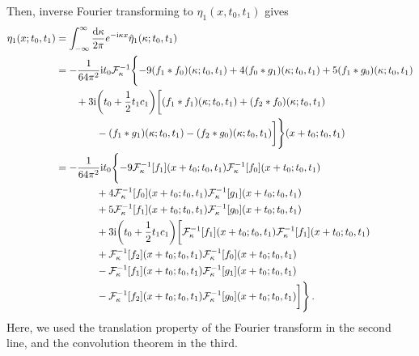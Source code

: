 \documentclass{jfm}
\newcommand{\im}{\mathrm{i}}
\begin{document}
Then, inverse Fourier transforming to $\eta_1(x,t_0,t_1)$ gives
\begin{equation}
\begin{aligned}
  \eta_1(x;t_0,t_1) &=
  \int_{-\infty}^{\infty} \frac{\dd{\kappa}}{2\pi} e^{-\im \kappa x}
  \hat{\eta}_1(\kappa;t_0,t_1) \\
  &= -\frac{1}{64 \pi^2} \im t_0 \mathcal{F}^{-1}_{\kappa}
  \Biggl\{
    -9 (f_1 * f_0)(\kappa; t_0,t_1)
    +4 (f_0 * g_1)(\kappa; t_0,t_1)
    +5 (f_1 * g_0)(\kappa; t_0,t_1) \\
    &\qquad
    + 3 \im \pqty{t_0 + \frac{1}{2} t_1 c_1} \biggl[
      (f_1 * f_1)(\kappa; t_0,t_1)
      + (f_2 * f_0)(\kappa; t_0,t_1) \\
    &\qquad\qquad
      - (f_1 * g_1)(\kappa; t_0,t_1)
      - (f_2 * g_0)(\kappa; t_0,t_1)
      \biggr] \Biggr\}
    (x + t_0;t_0,t_1) \\
  &= -\frac{1}{64 \pi^2} \im t_0
    \Biggl\{
     -9 \mathcal{F}^{-1}_{\kappa}[f_1](x + t_0;t_0,t_1)
       \mathcal{F}^{-1}_{\kappa}[f_0](x + t_0;t_0,t_1) \\
    &\qquad\qquad
    +4 \mathcal{F}^{-1}_{\kappa}[f_0](x + t_0;t_0,t_1)
       \mathcal{F}^{-1}_{\kappa}[g_1](x + t_0;t_0,t_1) \\
    &\qquad\qquad
    +5 \mathcal{F}^{-1}_{\kappa}[f_1](x + t_0;t_0,t_1)
       \mathcal{F}^{-1}_{\kappa}[g_0](x + t_0;t_0,t_1) \\
    &\qquad\qquad
    + 3 \im \pqty{t_0 + \frac{1}{2} t_1 c_1} \biggl[
      \mathcal{F}^{-1}_{\kappa}[f_1](x + t_0;t_0,t_1)
       \mathcal{F}^{-1}_{\kappa}[f_1](x + t_0;t_0,t_1) \\
    &\qquad\qquad
    + \mathcal{F}^{-1}_{\kappa}[f_2](x + t_0;t_0,t_1)
       \mathcal{F}^{-1}_{\kappa}[f_0](x + t_0;t_0,t_1) \\
    &\qquad\qquad
    - \mathcal{F}^{-1}_{\kappa}[f_1](x + t_0;t_0,t_1)
       \mathcal{F}^{-1}_{\kappa}[g_1](x + t_0;t_0,t_1) \\
    &\qquad\qquad
    - \mathcal{F}^{-1}_{\kappa}[f_2](x + t_0;t_0,t_1)
       \mathcal{F}^{-1}_{\kappa}[g_0](x + t_0;t_0,t_1)
    \biggr]
   \Biggr\}
    \,.
  \end{aligned}
  \label{eq:eta_generalized_real}
\end{equation}
Here, we used the translation property of the Fourier transform in the
second line, and the convolution theorem in the third.
\end{document}
